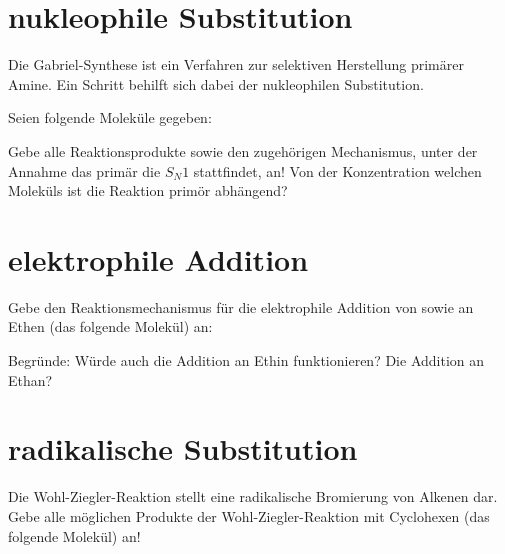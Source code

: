 \section{nukleophile Substitution}
\begin{task}
	Die Gabriel-Synthese ist ein Verfahren zur selektiven Herstellung primärer Amine. Ein Schritt behilft sich dabei der nukleophilen Substitution.

	Seien folgende Moleküle gegeben:

	\vspace{2em}
	\hspace{100pt}
	\vspace{2em}

	Gebe alle Reaktionsprodukte sowie den zugehörigen Mechanismus, unter der Annahme das primär die $S_N1$ stattfindet, an! Von der Konzentration welchen Moleküls ist die Reaktion primör abhängend?
\end{task}

\section{elektrophile Addition}
\begin{task}
Gebe den Reaktionsmechanismus für die elektrophile Addition von  sowie  an Ethen (das folgende Molekül) an:

\vspace{2em}

\end{task}

\begin{task}
	Begründe: Würde auch die Addition an Ethin funktionieren? Die Addition an Ethan?
\end{task}

\section{radikalische Substitution}
\begin{task}
Die Wohl-Ziegler-Reaktion stellt eine radikalische Bromierung von Alkenen dar. Gebe alle möglichen Produkte der Wohl-Ziegler-Reaktion mit Cyclohexen (das folgende Molekül) an!

\vspace{2em}
\end{task}
